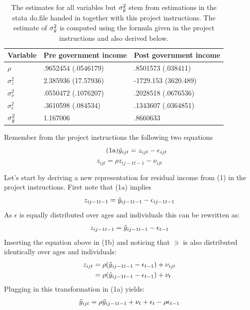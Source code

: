 \documentclass[12pt,a4paper]{article}
\begin{document}
\begin{table}[h]
\begin{tabular}{|l|l|l|}
\hline
\textbf{Variable} & \textbf{Pre government income} & \textbf{Post government income}  \\ \hline
$\rho$                        &   .9652454 (.0546179)  &  .8501573  (.038411)         \\ \hline
$\sigma^2_z$                  &   2.385936 (17.57936)  &  -1729.153 (3620.489)        \\ \hline
$\sigma^2_\nu$                &   .0550472 (.1076207)  &   .2028518 (.0676536)        \\ \hline
$\sigma^2_\epsilon$           &   .3610598  (.084534)  &   .1343607 (.0364851)        \\ \hline
$\sigma^2_{\Tilde{y}}$        &   1.167006             &   .8660633                   \\ \hline
\end{tabular}
\caption{\label{tab:estimates}The estimates for all variables but $\sigma^2_{\Tilde{y}}$ stem from estimations in the stata do.file handed in together with this project instructions. The estimate of $\sigma^2_{\Tilde{y}}$ is computed using the formula given in the project instructions and also derived below.}
\end{table}

Remember from the project instructions the following two equations
\begin{equation}\tag{1a}
    \Tilde{y}_{ijt} = z_{ijt} - \epsilon_{ijt}
\end{equation}
\begin{equation}\tag{1b}
    z_{ijt} = \rho z_{ij-1t-1} - \nu_{ijt}
\end{equation}

Let's start by deriving a new representation for residual income from (1) in the project instructions. First note that (1a) implies
\begin{align}
    z_{ij-1t-1} = \Tilde{y}_{ij-1t-1} - \epsilon_{ij-1t-1}
\end{align}
As $\epsilon$ is equally distributed over ages and individuals this can be rewritten as:
\begin{align}
    z_{ij-1t-1} = \Tilde{y}_{ij-1t-1} - \epsilon_{t-1}
\end{align}
Inserting the equation above in (1b) and noticing that $\ni$ is also distributed identically over ages and individuals:
\begin{align}
    z_{ijt} & = \rho(\Tilde{y}_{ij-1t-1} - \epsilon_{t-1}) + \nu_{ijt} \\
            & = \rho(\Tilde{y}_{ij-1t-1} - \epsilon_{t-1}) + \nu_{t}
\end{align}
Plugging in this transformation in (1a) yields:
\begin{align}
    \Tilde{y}_{ijt} = \rho\Tilde{y}_{ij-1t-1}  + \nu_{t} + \epsilon_t - \rho \epsilon_{t-1}
\end{align}
\end{document}
